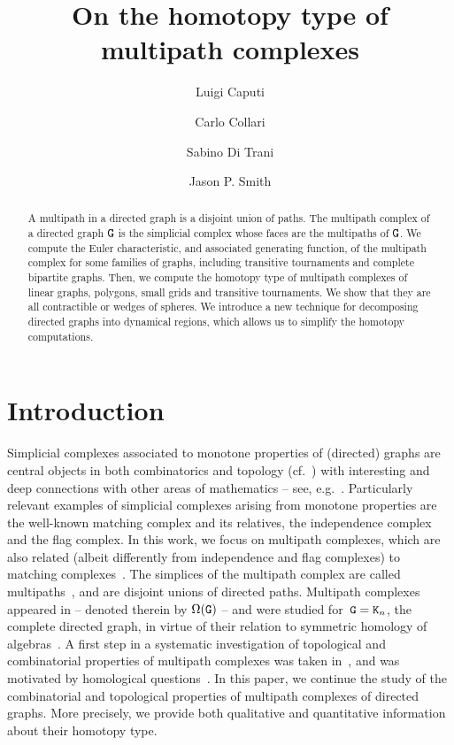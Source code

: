 \documentclass{amsart}
\title{On the homotopy type of multipath complexes}
\author{Luigi Caputi}
\author{Carlo Collari}
\author{Sabino Di Trani}
\author{Jason P. Smith}
\begin{document}
\maketitle


\begin{abstract}
A multipath in a directed graph is a disjoint union of paths. The multipath complex of a directed graph ${\tt G}$ is the simplicial complex whose faces are the multipaths of ${\tt G}$.  We compute the Euler characteristic, and associated generating function, of the multipath complex for some families of graphs, including transitive tournaments and complete bipartite graphs. Then, we compute the homotopy type of multipath complexes of linear graphs, polygons, small grids and transitive tournaments. We show that they are all contractible or wedges of spheres. We introduce a new technique for decomposing directed graphs into dynamical regions, which allows us to simplify the homotopy computations.
\end{abstract}


\section{Introduction}

Simplicial complexes associated to monotone properties of (directed) graphs are central objects in both combinatorics and topology (cf.~\cite{Jonsson}) with interesting and deep connections with other areas of mathematics -- see, e.g.~\cite{Vassiliev1993,MR2022345, PaoliniSalvetti}. 
Particularly relevant examples of simplicial complexes arising from monotone properties are the well-known matching complex and its relatives, the independence complex and the flag complex.  In this work, we focus  on multipath complexes, which are also related (albeit differently from independence and flag complexes) to matching complexes~\cite[Section~4]{SpriSecondo}. 
The simplices of the multipath complex are called multipaths~\cite{turner}, and are disjoint unions of directed paths.
Multipath complexes appeared in \cite{Omega} -- denoted therein by $\Omega({\tt G})$ -- and were studied for~${\tt G} = {\tt K}_n$, the complete directed graph, in virtue of their relation to symmetric homology of algebras~\cite{AultFed,AultNoFed}.
A first step in a systematic investigation of topological and combinatorial properties of  multipath complexes was taken in~\cite{secondo}, and was motivated by homological questions~\cite{primo}.
In this paper, we continue the study of the combinatorial and topological properties of multipath complexes of directed graphs. 
More precisely, we provide both qualitative and quantitative information about their homotopy type.  
\end{document}
